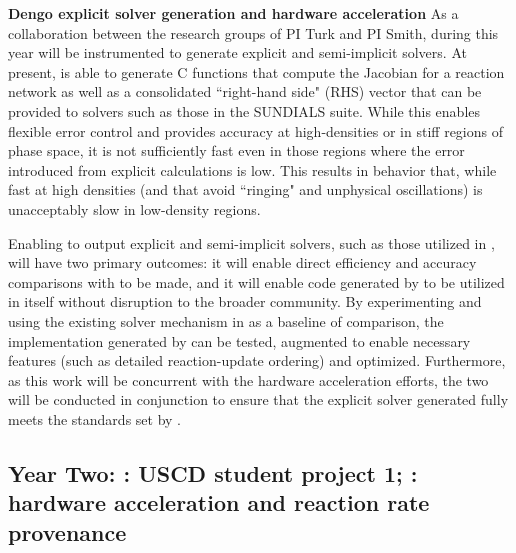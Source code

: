 \noindent \textbf{Dengo explicit solver generation and hardware acceleration}
As a collaboration between the research groups of PI Turk and PI Smith, during
this year \dengo{} will be instrumented to generate explicit and semi-implicit
solvers.  At present, \dengo{} is able to generate C functions that compute the
Jacobian for a reaction network as well as a consolidated ``right-hand side"
(RHS)
vector that can be provided to solvers such as those in the SUNDIALS suite.
While this enables flexible error control and provides accuracy at
high-densities or in stiff regions of phase space, it is not sufficiently fast
even in those regions where the error introduced from explicit calculations is
low.  This results in behavior that, while fast at high densities (and that
avoid ``ringing" and unphysical oscillations) is unacceptably slow in
low-density regions.

Enabling \dengo{} to output explicit and semi-implicit solvers, such as those
utilized in \grackle{}, will have two primary outcomes: it will enable direct
efficiency and accuracy comparisons with \grackle{} to be made, and it will
enable code generated by \dengo{} to be utilized in \grackle{} itself without
disruption to the broader community.  By experimenting and using the
existing solver mechanism in \grackle{} as a baseline of comparison, the
implementation generated by \dengo{} can be tested, augmented to enable
necessary features (such as detailed reaction-update ordering) and optimized.
Furthermore, as this work will be concurrent with the \grackle{} hardware
acceleration efforts, the two will be conducted in conjunction to ensure that
the explicit solver generated fully meets the standards set by \grackle{}.

\subsection{Year Two: \grackle{}: USCD student project 1; \dengo{}:
  hardware acceleration and reaction rate provenance}

